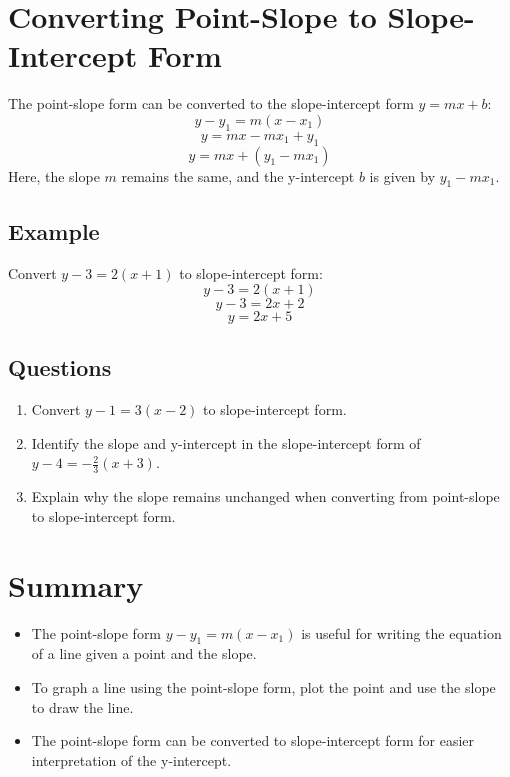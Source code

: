\documentclass[12pt]{article}
\begin{document}
\newpage

\section*{Converting Point-Slope to Slope-Intercept Form}

The point-slope form can be converted to the slope-intercept form \(y = mx + b\):
\[
y - y_1 = m(x - x_1)
\]
\[
y = mx - mx_1 + y_1
\]
\[
y = mx + (y_1 - mx_1)
\]
Here, the slope \(m\) remains the same, and the y-intercept \(b\) is given by \(y_1 - mx_1\).

\subsection*{Example}

Convert \(y - 3 = 2(x + 1)\) to slope-intercept form:
\[
y - 3 = 2(x + 1)
\]
\[
y - 3 = 2x + 2
\]
\[
y = 2x + 5
\]

\subsection*{Questions}
\begin{enumerate}
    \item Convert \(y - 1 = 3(x - 2)\) to slope-intercept form.
    \item Identify the slope and y-intercept in the slope-intercept form of \(y - 4 = -\frac{2}{3}(x + 3)\).
    \item Explain why the slope remains unchanged when converting from point-slope to slope-intercept form.
\end{enumerate}

\newpage

\section*{Summary}

\begin{itemize}
    \item The point-slope form \(y - y_1 = m(x - x_1)\) is useful for writing the equation of a line given a point and the slope.
    \item To graph a line using the point-slope form, plot the point and use the slope to draw the line.
    \item The point-slope form can be converted to slope-intercept form for easier interpretation of the y-intercept.
\end{itemize}
\end{document}
